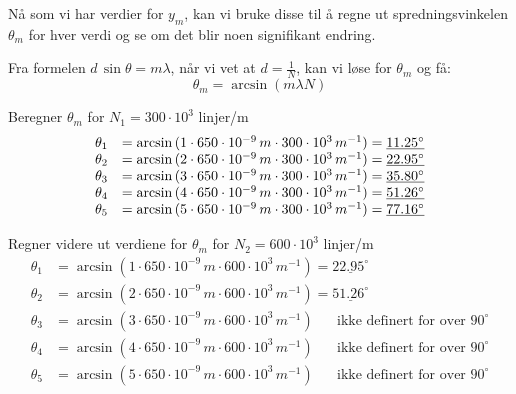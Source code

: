 \documentclass{article}
\begin{document}
\vspace{0.2 in}
Nå som vi har verdier for $y_m$, kan vi bruke disse til å regne ut spredningsvinkelen $\theta_m$ for hver verdi og se om det blir noen signifikant endring. 

\vspace{0.1in}
Fra formelen $d \, \sin{\theta} = m \lambda$, når vi vet at $d = \frac{1}{N}$, kan vi løse for $\theta_m$ og få:
\begin{equation}
    \theta_m = \arcsin{(m \lambda N)}
\end{equation}

Beregner $\theta_m$ for $N_1 = 300 \cdot 10^3$ linjer/m
\[
\begin{array}{r l}
    \theta_1 &= \arcsin{(1 \cdot 650 \cdot 10^{-9} \, m \cdot 300 \cdot 10^3 \, m^{-1})} = \underline{11.25 ^\circ} \\
    \theta_2 &= \arcsin{(2 \cdot 650 \cdot 10^{-9} \, m \cdot 300 \cdot 10^3 \, m^{-1})} = \underline{22.95 ^\circ} \\
    \theta_3 &= \arcsin{(3 \cdot 650 \cdot 10^{-9} \, m \cdot 300 \cdot 10^3 \, m^{-1})} = \underline{35.80 ^\circ} \\
    \theta_4 &= \arcsin{(4 \cdot 650 \cdot 10^{-9} \, m \cdot 300 \cdot 10^3 \, m^{-1})} = \underline{51.26 ^\circ} \\
    \theta_5 &= \arcsin{(5 \cdot 650 \cdot 10^{-9} \, m \cdot 300 \cdot 10^3 \, m^{-1})} = \underline{77.16 ^\circ}
\end{array}
\]


Regner videre ut verdiene for $\theta_m$ for $N_2 = 600 \cdot 10^3$ linjer/m
\[
\begin{aligned}
    \theta_1 &= \arcsin{(1 \cdot 650 \cdot 10^{-9} \, m \cdot 600 \cdot 10^3 \, m^{-1})} = \underline{22.95 ^\circ} \\
    \theta_2 &= \arcsin{(2 \cdot 650 \cdot 10^{-9} \, m \cdot 600 \cdot 10^3 \, m^{-1})} = \underline{51.26 ^\circ} \\
    \theta_3 &= \arcsin{(3 \cdot 650 \cdot 10^{-9} \, m \cdot 600 \cdot 10^3 \, m^{-1})} \phantom{=} \text{ ikke definert for over } 90^\circ \\
    \theta_4 &= \arcsin{(4 \cdot 650 \cdot 10^{-9} \, m \cdot 600 \cdot 10^3 \, m^{-1})} \phantom{=} \text{ ikke definert for over } 90^\circ \\
    \theta_5 &= \arcsin{(5 \cdot 650 \cdot 10^{-9} \, m \cdot 600 \cdot 10^3 \, m^{-1})} \phantom{=} \text{ ikke definert for over } 90^\circ
\end{aligned}
\]
\end{document}
